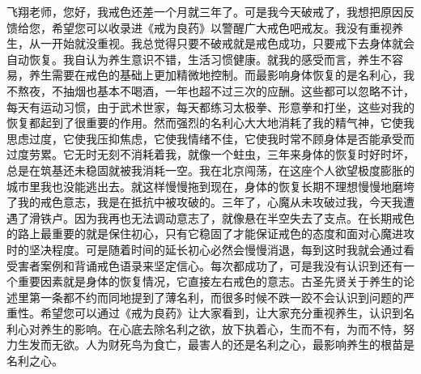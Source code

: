 \begin{case}
    飞翔老师，您好，我戒色还差一个月就三年了。可是我今天破戒了，我想把原因反馈给您，希望您可以收录进《戒为良药》以警醒广大戒色吧戒友。我没有重视养生，从一开始就没重视。我总觉得只要不破戒就是戒色成功，只要戒下去身体就会自动恢复。我自认为养生意识不错，生活习惯健康。就我的感受而言，养生不容易，养生需要在戒色的基础上更加精微地控制。而最影响身体恢复的是名利心，我不熬夜，不抽烟也基本不喝酒，一年也超不过三次的应酬。这些都可以忽略不计，每天有运动习惯，由于武术世家，每天都练习太极拳、形意拳和打坐，这些对我的恢复都起到了很重要的作用。然而强烈的名利心大大地消耗了我的精气神，它使我思虑过度，它使我压抑焦虑，它使我情绪不佳，它使我时常不顾身体是否能承受而过度劳累。它无时无刻不消耗着我，就像一个蛀虫，三年来身体的恢复时好时坏，总是在筑基还未稳固就被我消耗一空。我在北京闯荡，在这座个人欲望极度膨胀的城市里我也没能逃出去。就这样慢慢拖到现在，身体的恢复长期不理想慢慢地磨垮了我的戒色意志，我是在抵抗中被攻破的。三年了，心魔从未攻破过我，今天我遭遇了滑铁卢。因为我再也无法调动意志了，就像悬在半空失去了支点。在长期戒色的路上最重要的就是保住初心，只有它稳固了才能保证戒色的态度和面对心魔进攻时的坚决程度。可是随着时间的延长初心必然会慢慢消退，每到这时我就会通过看受害者案例和背诵戒色语录来坚定信心。每次都成功了，可是我没有认识到还有一个重要因素就是身体的恢复情况，它直接左右戒色的意志。古圣先贤关于养生的论述里第一条都不约而同地提到了薄名利，而很多时候不跌一跤不会认识到问题的严重性。希望您可以通过《戒为良药》让大家看到，让大家充分重视养生，认识到名利心对养生的影响。在心底去除名利之欲，放下执着心，生而不有，为而不恃，努力生发而无欲。人为财死鸟为食亡，最害人的还是名利之心，最影响养生的根苗是名利之心。

\end{case}

